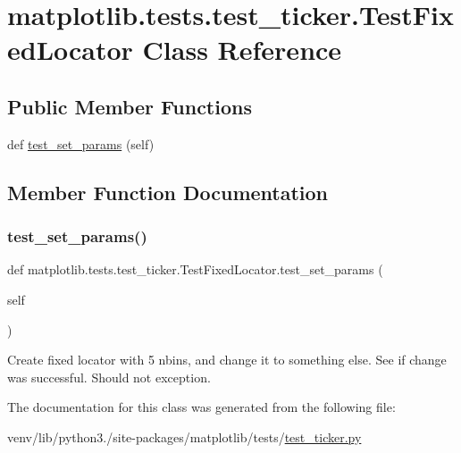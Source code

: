 \hypertarget{classmatplotlib_1_1tests_1_1test__ticker_1_1TestFixedLocator}{}\section{matplotlib.\+tests.\+test\+\_\+ticker.\+Test\+Fixed\+Locator Class Reference}
\label{classmatplotlib_1_1tests_1_1test__ticker_1_1TestFixedLocator}
\subsection*{Public Member Functions}
\begin{DoxyCompactItemize}
\item 
def \hyperlink{classmatplotlib_1_1tests_1_1test__ticker_1_1TestFixedLocator_a4384ba342b5dbfc6c428fdaaffb89553}{test\+\_\+set\+\_\+params} (self)
\end{DoxyCompactItemize}


\subsection{Member Function Documentation}
\mbox{\label{classmatplotlib_1_1tests_1_1test__ticker_1_1TestFixedLocator_a4384ba342b5dbfc6c428fdaaffb89553}} 
\subsubsection{\texorpdfstring{test\+\_\+set\+\_\+params()}{test\_set\_params()}}
{\footnotesize\ttfamily def matplotlib.\+tests.\+test\+\_\+ticker.\+Test\+Fixed\+Locator.\+test\+\_\+set\+\_\+params (\begin{DoxyParamCaption}\item[{}]{self }\end{DoxyParamCaption})}

\begin{DoxyVerb}Create fixed locator with 5 nbins, and change it to something else.
See if change was successful.
Should not exception.
\end{DoxyVerb}
 

The documentation for this class was generated from the following file\+:\begin{DoxyCompactItemize}
\item 
venv/lib/python3./site-\/packages/matplotlib/tests/\hyperlink{test__ticker_8py}{test\+\_\+ticker.\+py}\end{DoxyCompactItemize}
